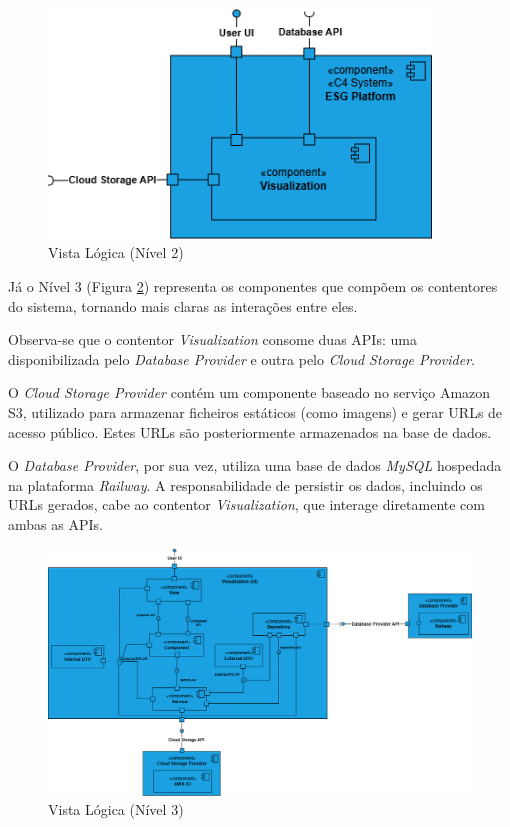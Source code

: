 \begin{figure}[H]
    \centering
    \includegraphics[width=4in,keepaspectratio]{frontmatter/assets/diagrams/Logical View/Logical View Lv2.drawio.png}
    \caption{Vista Lógica (Nível 2)}
    \label{fig:logical_view_lv2}
\end{figure}

Já o Nível 3 (Figura \ref{fig:logical_view_lv3}) representa os componentes que compõem os contentores do sistema, tornando mais claras as interações entre eles.

Observa-se que o contentor \textit{Visualization} consome duas APIs: uma disponibilizada pelo \textit{Database Provider} e outra pelo \textit{Cloud Storage Provider}.

O \textit{Cloud Storage Provider} contém um componente baseado no serviço Amazon S3, utilizado para armazenar ficheiros estáticos (como imagens) e gerar URLs de acesso público. Estes URLs são posteriormente armazenados na base de dados.

O \textit{Database Provider}, por sua vez, utiliza uma base de dados \textit{MySQL} hospedada na plataforma \textit{Railway}. A responsabilidade de persistir os dados, incluindo os URLs gerados, cabe ao contentor \textit{Visualization}, que interage diretamente com ambas as APIs.

\begin{landscape}
\begin{figure}[p]
    \centering
    \includegraphics[width=\linewidth,keepaspectratio]{frontmatter/assets/diagrams/Logical View/Logical View Lv3.drawio.png}
    \caption{Vista Lógica (Nível 3)}
    \label{fig:logical_view_lv3}
\end{figure}
\end{landscape}

